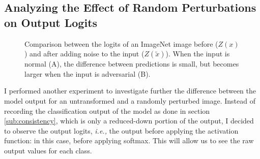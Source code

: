 \subsection{Analyzing the Effect of Random Perturbations on Output Logits}
\label{sub:logits_differences}
\begin{figure}[ht]
    \centering

     \caption{Comparison between the logits of an ImageNet image before
        ($Z(x)$) and after adding noise to the input ($Z(\tilde{x})$). When the
        input is normal (A), the difference between predictions is small, but
        becomes larger when the input is adversarial (B).}
    \label{fig:logits}
\end{figure}

I performed another experiment to investigate further the difference between the
model output for an untransformed and a randomly perturbed image. Instead of
recording the classification output of the model as done in section
\ref{sub:consistency}, which is only a reduced-down portion of the output, I
decided to observe the output logits, \emph{i.e.,} the output before applying
the activation function: in this case, before applying softmax. This will allow
us to see the raw output values for each class.

